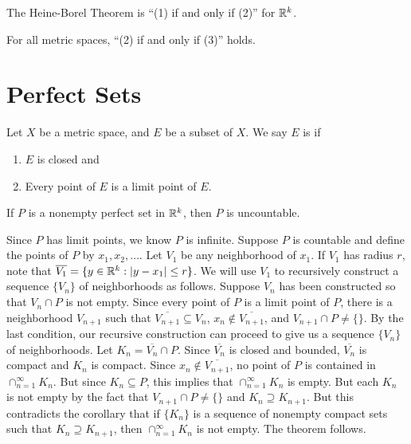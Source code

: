 \documentclass{mathnotes}
\begin{document}
\begin{note}
  The Heine-Borel Theorem is ``(1) if and only if (2)'' for $\mathbb{R}^k$.
\end{note}

\begin{note}
  For all metric spaces, ``(2) if and only if (3)'' holds.
\end{note}

\section*{Perfect Sets}

\begin{defi}
  Let $X$ be a metric space, and $E$ be a subset of $X$. We say $E$ is
   if
  \begin{enumerate}
    \item $E$ is closed and
    \item Every point of $E$ is a limit point of $E$.
  \end{enumerate}
\end{defi}

\begin{prop}
  If $P$ is a nonempty perfect set in $\mathbb{R}^k$, then $P$ is uncountable.
\end{prop}

\begin{pf}
  Since $P$ has limit points, we know $P$ is infinite. Suppose $P$ is countable
  and define the points of $P$ by $x_1,x_2,\ldots$. Let $V_1$ be any
  neighborhood of $x_1$. If $V_1$ has radius $r$, note that
  $\overline{V_1}=\{y\in\mathbb{R}^k:|y-x_1|\le r\}$. We will use $V_1$ to recursively
  construct a sequence $\{V_n\}$ of neighborhoods as follows. Suppose $V_n$ has
  been constructed so that $V_n\cap P$ is not empty. Since every point of $P$
  is a limit point of $P$, there is a neighborhood $V_{n+1}$ such that
  $\overline{V_{n+1}}\subseteq V_n$, $x_n\notin\overline{V_{n+1}}$, and
  $V_{n+1}\cap P\neq\{\}$. By the last condition, our recursive construction
  can proceed to give us a sequence $\{V_n\}$ of neighborhoods. Let
  $K_n=\overline{V_n}\cap P$. Since $\overline{V_n}$ is closed and bounded,
  $\overline{V_n}$ is compact and $K_n$ is compact. Since
  $x_n\notin\overline{V_{n+1}}$, no point of $P$ is contained in
  $\cap_{n=1}^\infty K_n$. But since $K_n\subseteq P$, this implies that
  $\cap_{n=1}^\infty K_n$ is empty. But each $K_n$ is not empty by the fact
  that $V_{n+1}\cap P\neq\{\}$ and $K_n\supseteq K_{n+1}$. But this contradicts
  the corollary that if $\{K_n\}$ is a sequence of nonempty compact sets such
  that $K_n\supseteq K_{n+1}$, then $\cap_{n=1}^\infty K_n$ is not empty. The
  theorem follows.
\end{pf}
\end{document}
